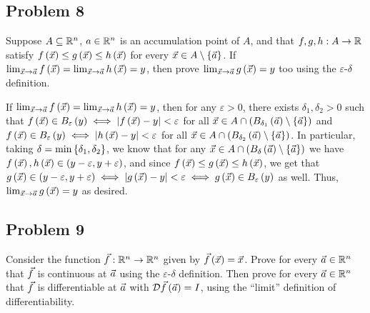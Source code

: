 \documentclass[main.tex]{subfiles}
\begin{document}
\subsection{Problem 8}
\begin{claim}
    Suppose $A \subseteq \mathbb R^n$, $a \in \mathbb R^n$ is an accumulation point of $A$, and that $f,g,h : A \to \mathbb R$ satisfy $f\left( \vec{x} \right) \le g\left( \vec{x} \right) \le h\left( \vec{x} \right)$ for every $\vec{x} \in A \setminus \left\{ \vec{a} \right\}$. If $\lim_{\vec{x}\to \vec{a}} f\left( \vec{x} \right) = \lim_{\vec{x}\to \vec{a}} h\left( \vec{x} \right) = y$, then prove $\lim_{\vec{x}\to \vec{a}} g\left( \vec{x} \right) = y$ too using the $\varepsilon$-$\delta$ definition.
\end{claim}

\begin{soln}
    If $\lim_{\vec{x}\to \vec{a}} f\left( \vec{x} \right) = \lim_{\vec{x}\to \vec{a}} h\left( \vec{x} \right) = y$, then for any $\varepsilon > 0$, there exists $\delta_1, \delta_2 > 0$ such that $f\left( \vec{x} \right)\in B_\varepsilon\left( y \right) \iff \left\lvert f\left( \vec{x} \right) - y \right\rvert < \varepsilon$ for all $\vec{x}\in A\cap \left( B_{\delta_1}\left( \vec{a} \right) \setminus \left\{ \vec{a} \right\} \right)$ and $f\left( \vec{x} \right)\in B_\varepsilon\left( y \right) \iff \left\lvert h\left( \vec{x} \right) - y \right\rvert < \varepsilon$ for all $\vec{x}\in A\cap \left( B_{\delta_2}\left( \vec{a} \right) \setminus \left\{ \vec{a} \right\} \right)$. In particular, taking $\delta = \min\left\{ \delta_1, \delta_2 \right\}$, we know that for any $\vec{x}\in A\cap \left( B_\delta\left( \vec{a} \right)\setminus \left\{ \vec{a} \right\} \right)$ we have $f\left( \vec{x} \right), h\left( \vec{x} \right)\in (y - \varepsilon, y + \varepsilon)$, and since $f\left( \vec{x} \right)\le g\left( \vec{x} \right)\le h\left( \vec{x} \right)$, we get that $g\left( \vec{x} \right)\in (y - \varepsilon, y + \varepsilon)\iff \left\lvert g\left( \vec{x} \right) - y \right\rvert < \varepsilon\iff g\left( \vec{x} \right)\in B_\varepsilon\left( y \right)$ as well. Thus, $\lim_{\vec{x}\to \vec{a}} g\left( \vec{x} \right) = y$ as desired.
\end{soln}
\eject

\subsection{Problem 9}
\begin{claim}
    Consider the function $\vec{f} : \mathbb R^n \to \mathbb R^n$ given by $\vec{f}\left( \vec{x} \right) = \vec{x}$. Prove for every $\vec{a} \in \mathbb R^n$ that $\vec{f}$ is continuous at $\vec{a}$ using the $\varepsilon$-$\delta$ definition. Then prove for every $\vec{a} \in \mathbb R^n$ that $\vec{f}$ is differentiable at $\vec{a}$ with $\mathcal{D}\vec{f}\left( \vec{a} \right) = I$, using the “limit” definition of differentiability.
\end{claim}
\end{document}
